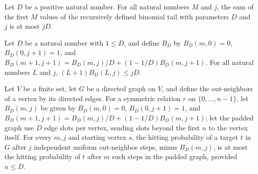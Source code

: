 \begin{theorem}
\label{Randomized.sum_binTail_le}
\leanok
{}
Let $D$ be a positive natural number. For all natural numbers $M$ and $j$, the sum of
the first $M$ values of the recursively defined binomial tail with parameters $D$ and
$j$ is at most $jD$.
\end{theorem}

\begin{theorem}
\label{Randomized.succ_mul_binTail_le}
\leanok
{}
Let $D$ be a natural number with $1\le D$, and define $B_D$ by $B_D(m,0)=0$,
$B_D(0,j+1)=1$, and $B_D(m+1,j+1)=B_D(m,j)/D+(1-1/D)B_D(m,j+1)$. For all natural numbers
$L$ and $j$, $(L+1)B_D(L,j)\le jD$.
\end{theorem}

\begin{theorem}
\label{Randomized.sub_binTail_le_hitProb}
\leanok
{}
Let $V$ be a finite set, let $G$ be a directed graph on $V$, and define the
out-neighbors of a vertex by its directed edges. For a symmetric relation $r$ on
$\{0,\ldots,n-1\}$, let $B_D(m,j)$ be given by $B_D(m,0)=0$, $B_D(0,j+1)=1$, and
$B_D(m+1,j+1)=B_D(m,j)/D+(1-1/D)B_D(m,j+1)$; let the padded graph use $D$ edge slots per
vertex, sending slots beyond the first $n$ to the vertex itself. For every $m,j$ and
starting vertex $s$, the hitting probability of a target $t$ in $G$ after $j$
independent uniform out-neighbor steps, minus $B_D(m,j)$, is at most the hitting
probability of $t$ after $m$ such steps in the padded graph, provided $n\le D$.
\end{theorem}

